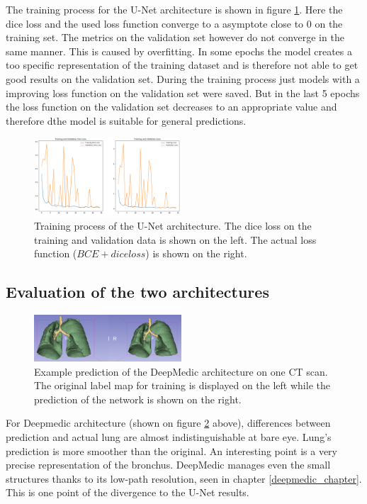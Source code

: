 The training process for the U-Net architecture is shown in figure \ref{train_unet}. Here the dice loss and the used loss function converge to a asymptote close to 0 on the training set. The metrics on the validation set however do not converge in the same manner. This is caused by overfitting. In some epochs the model creates a too specific representation of the training dataset and is therefore not able to get good results on the validation set. During the training process just models with a improving loss function on the validation set were saved. But in the last 5 epochs the loss function on the validation set decreases to an appropriate value and therefore dthe model is suitable for general predictions. 

\begin{figure}[h!]
	\includegraphics[width=0.49\textwidth, angle=0]{files/jpgunettrain.png}
	\caption{Training process of the U-Net architecture. The dice loss on the training and validation data is shown on the left. The actual loss function ($BCE + dice loss$) is shown on the right.}
	\label{train_unet}
\end{figure}

\subsection{Evaluation of the two architectures}

\begin{figure}[h!]
	\includegraphics[width=0.49\textwidth, angle=0]{files/preddeepmedic.png}
	\caption{Example prediction of the DeepMedic architecture on one CT scan. The original label map for training is displayed on the left while the prediction of the network is shown on the right.}
	\label{pred_deepmedic}
\end{figure}

For Deepmedic architecture (shown on figure \ref{pred_deepmedic} above), differences between prediction and actual lung are almost indistinguishable at bare eye. Lung's prediction is more smoother than the original. An interesting point is a very precise representation of the bronchus. DeepMedic manages even the small structures thanks to its low-path resolution, seen in chapter \ref{deepmedic_chapter}. This is one point of the divergence to the U-Net results.\newline

